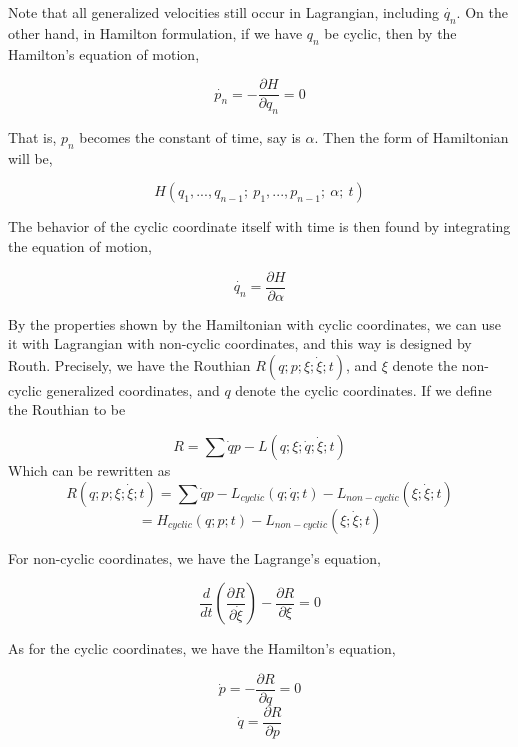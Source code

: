 \documentclass[12pt]{article}
\numberwithin{equation}{section}
\begin{document}
Note that all generalized velocities still occur in Lagrangian, including $\dot{q_n}$. On the other hand, in Hamilton formulation, if we have $q_n$ be cyclic, then by the Hamilton's equation of motion,

\begin{center}
    \[ \dot{p_n} = - \frac{\partial H}{\partial q_n}  = 0 \]
\end{center}

That is, $p_n$ becomes the constant of time, say is $\alpha$. Then the form of Hamiltonian will be,

\begin{center}
    \[ H(q_1, ..., q_{n-1};\ p_1, ..., p_{n-1};\ \alpha;\ t) \]
\end{center}

The behavior of the cyclic coordinate itself with time is then found by integrating the equation of motion,

\begin{center}
    \[ \dot{q_n} = \frac{\partial H}{\partial \alpha} \]
\end{center}

By the properties shown by the Hamiltonian with cyclic coordinates, we can use it with Lagrangian with non-cyclic coordinates, and this way is designed by Routh. Precisely, we have the Routhian $R(q; p; \xi; \dot{\xi}; t)$, and $\xi$ denote the non-cyclic generalized coordinates, and $q$ denote the cyclic coordinates.
If we define the Routhian to be

\begin{center}
    \[ R = \sum{\dot{q}p} - L(q; \xi; \dot{q}; \dot{\xi}; t) \]
    Which can be rewritten as 
    \[ R(q;p;\xi;\dot{\xi};t) = \sum{\dot{q}p} - L_{cyclic}(q;\dot{q};t) - L_{non-cyclic}(\xi;\dot{\xi};t) \]
    \[ = H_{cyclic}(q;p;t) - L_{non-cyclic}(\xi;\dot{\xi};t) \]
\end{center}

For non-cyclic coordinates, we have the Lagrange's equation,

\begin{center}
    \[ \frac{d}{dt} \left( \frac{\partial R}{\partial \dot{\xi}} \right) - \frac{\partial R}{\partial \xi} = 0 \]
\end{center}

As for the cyclic coordinates, we have the Hamilton's equation,

\begin{center}
    \[ \dot{p} = -\frac{\partial R}{\partial q} = 0\]
    \[ \dot{q} = \frac{\partial R}{\partial p}\]
\end{center}
\end{document}
